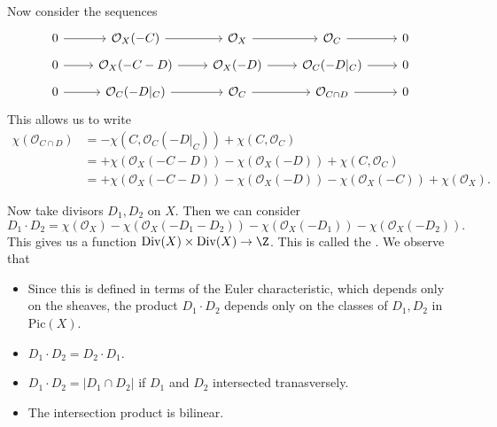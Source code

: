 \documentclass[a4paper]{article}
\newcommand\Div{\mathrm{Div}}
\newcommand\Pic{\mathrm{Pic}}
\begin{document}
Now consider the sequences
\[
  \begin{tikzcd}[row sep=tiny]
    0 \ar[r] & \mathcal{O}_X(-C) \ar[r] & \mathcal{O}_X \ar[r] & \mathcal{O}_C \ar[r] & 0\\
    0 \ar[r] & \mathcal{O}_X(-C - D) \ar[r] & \mathcal{O}_X(-D) \ar[r] & \mathcal{O}_C(-D|_C) \ar[r] & 0\\
    0 \ar[r] & \mathcal{O}_C(-D|_C) \ar[r] & \mathcal{O}_C \ar[r] & \mathcal{O}_{C \cap D} \ar[r] & 0
  \end{tikzcd}
\]
This allows us to write
\begin{align*}
  \chi(\mathcal{O}_{C \cap D}) &= -\chi(C, \mathcal{O}_C(-D|_C)) + \chi(C, \mathcal{O}_C)\\
  &= + \chi(\mathcal{O}_X(-C - D)) - \chi(\mathcal{O}_X(-D)) + \chi(C, \mathcal{O}_C)\\
  &= + \chi(\mathcal{O}_X(-C - D)) - \chi(\mathcal{O}_X(-D)) - \chi(\mathcal{O}_X(-C)) + \chi(\mathcal{O}_X).
\end{align*}

Now take divisors $D_1, D_2$ on $X$. Then we can consider
\[
  D_1 \cdot D_2 = \chi(\mathcal{O}_X) - \chi(\mathcal{O}_X(-D_1 - D_2)) - \chi(\mathcal{O}_X(-D_1)) - \chi(\mathcal{O}_X(-D_2)).
\]
This gives us a function $\Div(X) \times \Div(X) \to \Z$. This is called the . We observe that
\begin{itemize}
  \item Since this is defined in terms of the Euler characteristic, which depends only on the sheaves, the product $D_1 \cdot D_2$ depends only on the classes of $D_1, D_2$ in $\Pic(X)$.
  \item $D_1 \cdot D_2 = D_2 \cdot D_1$.
  \item $D_1 \cdot D_2 = |D_1 \cap D_2|$ if $D_1$ and $D_2$ intersected tranasversely.
  \item %
    The intersection product is bilinear. %
\end{itemize}
\end{document}
